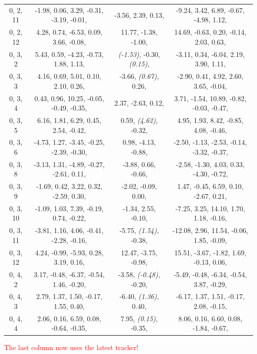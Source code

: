 \documentclass[compress]{beamer}
\begin{document}
\begin{frame}
{\begin{tabular}{c c c c}
0, 2, 11 &  -1.98,   0.06,   3.29,   -0.31,   -3.19,   -0.01,  &  -3.56,   2.39,   0.13,  &  -9.24,   3.42,   6.89,   -0.67,   -4.98,   1.12,  \\
0, 2, 12 &  4.28,   0.74,   -6.53,   0.09,   3.66,   -0.08,  &  11.77,   -1.38,   -1.00,  &  14.69,   -0.63,   0.20,   -0.14,   2.03,   0.63,  \\
0, 3, 2 &  5.43,   0.59,   -4.23,   -0.73,   1.88,   1.13,  &  {\it (-1.53),}   -0.30,   {\it (0.15),}  &  -3.11,   0.34,   -6.04,   2.19,   3.90,   1.11,  \\
0, 3, 3 &  4.16,   0.69,   5.01,   0.10,   2.10,   0.26,  &  -3.66,   {\it (0.67),}   0.26,  &  -2.90,   0.41,   4.92,   2.60,   3.65,   -0.04,  \\
0, 3, 4 &  0.43,   0.96,   10.25,   -0.05,   -0.49,   -0.35,  &  2.37,   -2.63,   0.12,  &  3.71,   -1.54,   10.89,   -0.82,   -0.03,   -0.47,  \\
0, 3, 5 &  6.16,   1.81,   6.29,   0.45,   2.54,   -0.42,  &  0.59,   {\it (4.62),}   -0.32,  &  4.95,   1.93,   8.42,   -0.85,   4.08,   -0.46,  \\
0, 3, 6 &  -4.73,   1.27,   -3.45,   -0.25,   -2.39,   -0.30,  &  0.98,   -4.13,   -0.88,  &  -2.50,   -1.13,   -2.53,   -0.14,   -3.32,   -0.37,  \\
0, 3, 8 &  -3.13,   1.31,   -4.89,   -0.27,   -2.61,   0.11,  &  -3.88,   0.66,   -0.66,  &  -2.58,   -1.30,   4.03,   0.33,   -4.30,   -0.72,  \\
0, 3, 9 &  -1.69,   0.42,   3.22,   0.32,   -2.59,   0.30,  &  -2.02,   -0.09,   0.00,  &  1.47,   -0.45,   6.59,   0.10,   -2.67,   0.21,  \\
0, 3, 10 &  -1.09,   1.03,   7.39,   -0.19,   0.74,   -0.22,  &  -1.34,   2.55,   -0.10,  &  -7.25,   3.25,   14.10,   1.70,   1.18,   -0.16,  \\
0, 3, 11 &  -3.81,   1.16,   4.06,   -0.41,   -2.28,   -0.16,  &  -5.75,   {\it (1.54),}   -0.38,  &  -12.08,   2.96,   11.54,   -0.06,   1.85,   -0.09,  \\
0, 3, 12 &  4.24,   -0.99,   -5.93,   0.28,   3.19,   0.16,  &  12.47,   -3.75,   -0.98,  &  15.51,   -3.67,   -1.82,   1.69,   -0.13,   0.06,  \\
0, 4, 2 &  3.17,   -0.48,   -6.37,   -0.54,   1.46,   -0.20,  &  -3.58,   {\it (-0.48),}   -0.20,  &  -5.49,   -0.48,   -6.34,   -0.54,   3.87,   -0.29,  \\
0, 4, 3 &  2.79,   1.37,   1.50,   -0.17,   1.55,   0.40,  &  -6.40,   {\it (1.36),}   0.40,  &  -6.17,   1.37,   1.51,   -0.17,   2.08,   -0.15,  \\
0, 4, 4 &  2.06,   0.16,   6.59,   0.08,   -0.64,   -0.35,  &  7.95,   {\it (0.15),}   -0.35,  &  8.06,   0.16,   6.60,   0.08,   -1.84,   -0.67,  \\
\end{tabular}}

\vfill \tiny \textcolor{red}{The last column now uses the latest tracker!}
\end{frame}
\end{document}
